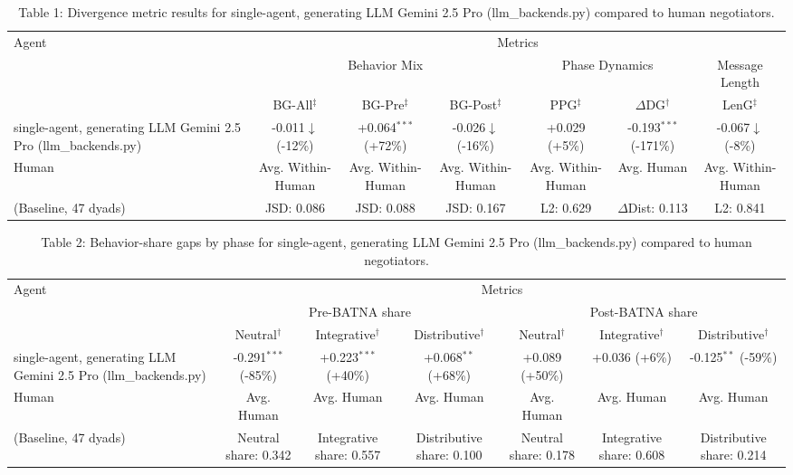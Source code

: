 \begin{table}[t]
\centering
\begin{tabular}{lcccccc}
\toprule
\multirow{3}{*}{Agent} & \multicolumn{6}{c}{Metrics} \\
\cmidrule(lr){2-7}
 & \multicolumn{3}{c}{Behavior Mix} & \multicolumn{2}{c}{Phase Dynamics} & \multicolumn{1}{c}{Message Length} \\
\cmidrule(lr){2-4} \cmidrule(lr){5-6} \cmidrule(lr){7-7}
 & BG-All$^\ddagger$ & BG-Pre$^\ddagger$ & BG-Post$^\ddagger$ & PPG$^\ddagger$ & $\Delta$DG$^\dagger$ & LenG$^\ddagger$ \\
\midrule
single-agent, generating LLM Gemini 2.5 Pro (llm_backends.py) & -0.011$\downarrow$ (-12\%) & +0.064$^{***}$ (+72\%) & -0.026$\downarrow$ (-16\%) & +0.029 (+5\%) & -0.193$^{***}$ (-171\%) & -0.067$\downarrow$ (-8\%) \\
\midrule
Human & Avg. Within-Human & Avg. Within-Human & Avg. Within-Human & Avg. Within-Human & Avg. Human & Avg. Within-Human \\
(Baseline, 47 dyads) & JSD: 0.086 & JSD: 0.088 & JSD: 0.167 & L2: 0.629 & $\Delta$Dist: 0.113 & L2: 0.841 \\
\bottomrule
\end{tabular}
\caption{Table 1: Divergence metric results for single-agent, generating LLM Gemini 2.5 Pro (llm_backends.py) compared to human negotiators.}
\end{table}

\begin{table}[t]
\centering
\begin{tabular}{lcccccc}
\toprule
\multirow{3}{*}{Agent} & \multicolumn{6}{c}{Metrics} \\
\cmidrule(lr){2-7}
 & \multicolumn{3}{c}{Pre-BATNA share} & \multicolumn{3}{c}{Post-BATNA share} \\
\cmidrule(lr){2-4} \cmidrule(lr){5-7}
 & Neutral$^\dagger$ & Integrative$^\dagger$ & Distributive$^\dagger$ & Neutral$^\dagger$ & Integrative$^\dagger$ & Distributive$^\dagger$ \\
\midrule
single-agent, generating LLM Gemini 2.5 Pro (llm_backends.py) & -0.291$^{***}$ (-85\%) & +0.223$^{***}$ (+40\%) & +0.068$^{**}$ (+68\%) & +0.089 (+50\%) & +0.036 (+6\%) & -0.125$^{**}$ (-59\%) \\
\midrule
Human & Avg. Human & Avg. Human & Avg. Human & Avg. Human & Avg. Human & Avg. Human \\
(Baseline, 47 dyads) & Neutral share: 0.342 & Integrative share: 0.557 & Distributive share: 0.100 & Neutral share: 0.178 & Integrative share: 0.608 & Distributive share: 0.214 \\
\bottomrule
\end{tabular}
\caption{Table 2: Behavior-share gaps by phase for single-agent, generating LLM Gemini 2.5 Pro (llm_backends.py) compared to human negotiators.}
\end{table}
